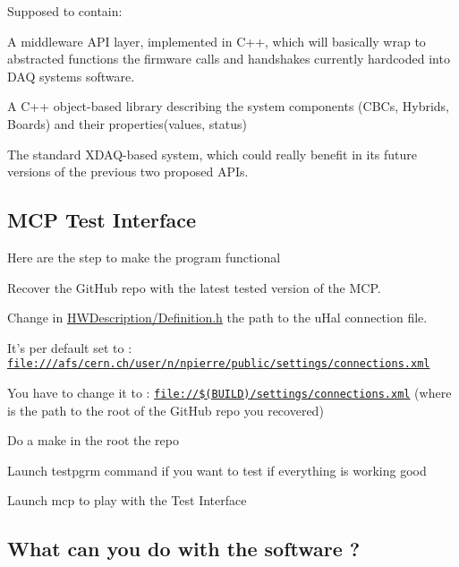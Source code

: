 Supposed to contain\-:


\begin{DoxyItemize}
\item A middleware A\-P\-I layer, implemented in C++, which will basically wrap to abstracted functions the firmware calls and handshakes currently hardcoded into D\-A\-Q systems software.
\item A C++ object-\/based library describing the system components (C\-B\-Cs, Hybrids, Boards) and their properties(values, status)
\item The standard X\-D\-A\-Q-\/based system, which could really benefit in its future versions of the previous two proposed A\-P\-Is.
\end{DoxyItemize}

\subsection*{M\-C\-P Test Interface }

Here are the step to make the program functional


\begin{DoxyEnumerate}
\item Recover the Git\-Hub repo with the latest tested version of the M\-C\-P.
\item Change in \hyperlink{_definition_8h}{H\-W\-Description/\-Definition.\-h} the path to the u\-Hal connection file.
\begin{DoxyItemize}
\item It's per default set to \-: \href{file:///afs/cern.ch/user/n/npierre/public/settings/connections.xml}{\tt file\-:///afs/cern.\-ch/user/n/npierre/public/settings/connections.\-xml}
\item You have to change it to \-: \href{file://$(BUILD)/settings/connections.xml}{\tt file\-://\$(\-B\-U\-I\-L\-D)/settings/connections.\-xml} (where  is the path to the root of the Git\-Hub repo you recovered)
\end{DoxyItemize}
\item Do a make in the root the repo
\item Launch testpgrm command if you want to test if everything is working good
\item Launch mcp to play with the Test Interface
\end{DoxyEnumerate}

\subsection*{What can you do with the software ? }

